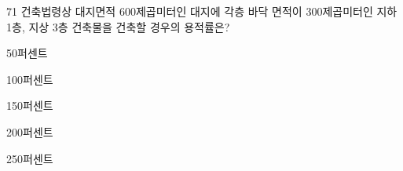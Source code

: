 \begin{question}{71}
건축법령상 대지면적 600제곱미터인 대지에 각층 바닥 면적이 300제곱미터인 지하 1층, 지상 3층 건축물을 건축할 경우의 용적률은?
\begin{choices}
  \item 50퍼센트
  \item 100퍼센트
  \item 150퍼센트
  \item 200퍼센트
  \item 250퍼센트
\end{choices}
\end{question}
